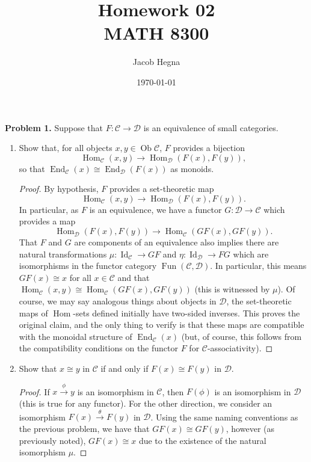 \documentclass[reqno]{amsart}
\title{Homework 02\\MATH 8300}
\author{Jacob Hegna}
\date{\today}
\DeclareMathOperator{\Ob}{Ob}
\DeclareMathOperator{\Id}{Id}
\DeclareMathOperator{\End}{End}
\DeclareMathOperator{\Fun}{Fun}
\DeclareMathOperator{\Hom}{Hom}
\theoremstyle{definition}
\theoremstyle{remark}
\newcommand{\prob}[1] {
  \textbf{Problem #1.}
}
\begin{document}
\maketitle

\prob{1} Suppose that $F : \mathcal{C} \to \mathcal{D}$ is an equivalence of
small categories.

\begin{enumerate}
  \item Show that, for all objects $x, y \in \Ob \mathcal{C}$, $F$ provides a
    bijection
    \[
      \Hom_\mathcal{C}(x, y) \to \Hom_\mathcal{D}(F(x), F(y)),
    \]
    so that $\End_\mathcal{C}(x) \cong \End_\mathcal{D}(F(x))$ as monoids.

    \begin{proof}
      By hypothesis, $F$ provides a set-theoretic map
      \[
        \Hom_\mathcal{C}(x, y) \to \Hom_\mathcal{D}(F(x), F(y)).
      \]
      In particular, as $F$ is an equivalence, we have a functor $G :
      \mathcal{D} \to \mathcal{C}$ which provides a map
      \[
        \Hom_\mathcal{D}(F(x), F(y)) \to \Hom_\mathcal{C}(GF(x), GF(y)).
      \]
      That $F$ and $G$ are components of an equivalence also implies there are
      natural transformations $\mu : \Id_\mathcal{C} \to GF$ and $\eta :
      \Id_\mathcal{D} \to FG$ which are isomorphisms in the functor category
      $\Fun(\mathcal{C}, \mathcal{D})$. In particular, this means $GF(x) \cong
      x$ for all $x \in \mathcal{C}$ and that $\Hom_\mathcal{C}(x, y) \cong
      \Hom_\mathcal{C}(GF(x), GF(y))$ (this is witnessed by $\mu$). Of course,
      we may say analogous things about objects in $\mathcal{D}$, the
      set-theoretic maps of $\Hom$-sets defined initially have two-sided
      inverses. This proves the original claim, and the only thing to verify is
      that these maps are compatible with the monoidal structure of
      $\End_\mathcal{C}(x)$ (but, of course, this follows from the compatibility
      conditions on the functor $F$ for $\mathcal{C}$-associativity).
    \end{proof}

  \item Show that $x \cong y$ in $\mathcal{C}$ if and only if $F(x) \cong F(y)$
    in $\mathcal{D}$.

    \begin{proof}
      If $x \xrightarrow{\phi} y$ is an isomorphism in $\mathcal{C}$, then
      $F(\phi)$ is an isomorphism in $\mathcal{D}$ (this is true for any
      functor). For the other direction, we consider an isomorphism $F(x)
      \xrightarrow{\theta} F(y)$ in $\mathcal{D}$. Using the same naming
      conventions as the previous problem, we have that $GF(x) \cong GF(y)$,
      however (as previously noted), $GF(x) \cong x$ due to the existence of the
      natural isomorphism $\mu$.
    \end{proof}


\end{enumerate}
\end{document}
